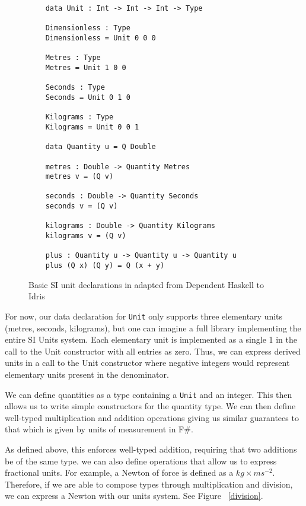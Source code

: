 \begin{figure}[ht!]
  \label{idris_code}
  \caption{Basic SI unit declarations in adapted from Dependent Haskell to Idris \protect\cite{gundry2013}}
  \begin{lstlisting}
    data Unit : Int -> Int -> Int -> Type
    
    Dimensionless : Type
    Dimensionless = Unit 0 0 0
    
    Metres : Type
    Metres = Unit 1 0 0
    
    Seconds : Type
    Seconds = Unit 0 1 0
    
    Kilograms : Type
    Kilograms = Unit 0 0 1
    
    data Quantity u = Q Double
    
    metres : Double -> Quantity Metres
    metres v = (Q v)
    
    seconds : Double -> Quantity Seconds
    seconds v = (Q v)
    
    kilograms : Double -> Quantity Kilograms
    kilograms v = (Q v)
    
    plus : Quantity u -> Quantity u -> Quantity u
    plus (Q x) (Q y) = Q (x + y)
  \end{lstlisting}
\end{figure}

For now, our data declaration for \texttt{Unit} only supports three elementary
units (metres, seconds, kilograms), but one can imagine a full library
implementing the entire SI Units system. Each elementary unit is implemented as
a single 1 in the call to the Unit constructor with all entries as zero. Thus,
we can express derived units in a call to the Unit constructor where negative
integers would represent elementary units present in the denominator. 

We can define quantities as a type containing a \texttt{Unit} and an integer.
This then allows us to write simple constructors for the quantity type. We can
then define well-typed multiplication and addition operations giving us similar
guarantees to that which is given by units of measurement in F\#. 

As defined above, this enforces well-typed addition, requiring that two
additions be of the same type. we can also define operations that allow us to
express fractional units. For example, a Newton of force is defined as a
$kg\times ms^{-2}$. Therefore, if we are able to compose types through
multiplication and division, we can express a Newton with our units system. See
Figure ~\ref{division}. 


